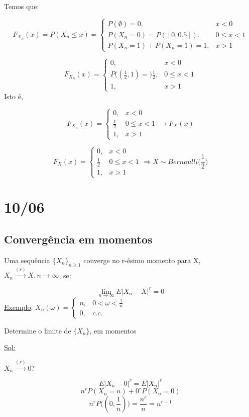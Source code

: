 \documentclass[a4paper,12pt]{article}
\begin{document}
Temos que:

$$F_{X_n}(x) = P(X_n\le x)=\begin{cases}
P(\emptyset)=0, & x<0\\
 P(X_n=0)=P([0,0.5]), & 0\le x <1\\
 P(X_n=1)+P(X_n=1)=1, & x>1
\end{cases} $$

$$
F_{X_n}(x) =\begin{cases}
0, & x<0\\
P\bigg((\frac{1}{2},1)=
\bigg)\frac{1}{2}, & 0\le x <1\\
1, & x>1
\end{cases}
$$
Isto é,

$$
F_  {X_n}(x) = \begin{cases}
0, & x<0\\
\frac{1}{2} & 0\le x<1\\
1, & x>1
\end{cases}
\longrightarrow F_X(x)
$$

$$
F_ X(x) = \begin{cases}
0, & x<0\\
\frac{1}{2} & 0\le x<1\\
1, & x>1
\end{cases}
\Rightarrow X \sim Bernoulli\bigg(\frac{1}{2}\bigg)
$$
\newpage 

\section{10/06}
\subsection{Convergência em momentos}

Uma sequência $\{X_n \}_{n\ge 1}$ converge no r-ésimo momento para X, $X_n\overset{(r)}{\longrightarrow}X,n \rightarrow \infty $,
se:

$$\lim\limits_{n\rightarrow \infty} E|X_n-X|^r=0 $$
\underline{Exemplo}:
$X_n(\omega) = \begin{cases}
n,& 0<\omega < \frac{1}{n}\\
0, & c.c.
\end{cases} $

Determine o limite de $\{X_n  \}$, em momentos

\underline{Sol:}

$X_n \overset{(r)}{\longrightarrow}  0 ?$

$$E|X_n-0|^r=E|X_n|^r$$
$$n^rP(X_n=n)+0^rP(X_n=0) $$
$$n^rP\bigg(
(0,\frac{1}{n})
\bigg)= \frac{n^r}{n}= n^{r-1} $$
\end{document}
